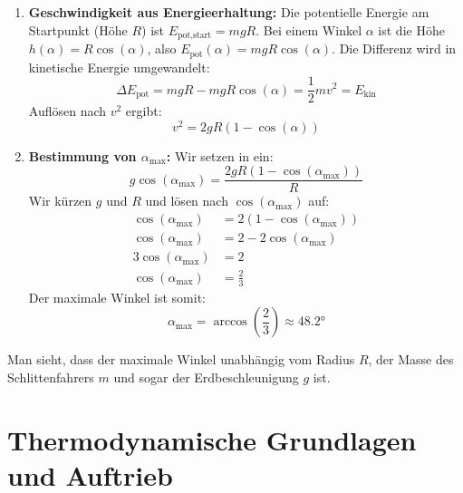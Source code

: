 \documentclass[ngerman]{scrreprt}
\newenvironment{loesungbox}[1]
  {\needspace{5\baselineskip}\begin{loesungboxstyle}[frametitle={#1}]}
  {\end{loesungboxstyle}}
\begin{document}
\begin{loesungbox}{Lösung zu \Cref{aufg:iglu_rutsche}}
\begin{enumerate}
    \item \textbf{Geschwindigkeit aus Energieerhaltung:}
    Die potentielle Energie am Startpunkt (Höhe $R$) ist $E_{\text{pot,start}} = mgR$. Bei einem Winkel $\alpha$ ist die Höhe $h(\alpha) = R\cos(\alpha)$, also $E_{\text{pot}}(\alpha) = mgR\cos(\alpha)$. Die Differenz wird in kinetische Energie umgewandelt: 
    \begin{equation}
        \Delta E_{\text{pot}} = mgR - mgR\cos(\alpha) = \frac{1}{2}mv^2 = E_{\text{kin}}
    \end{equation}
    Auflösen nach $v^2$ ergibt:
    \begin{equation}
        v^2 = 2gR(1-\cos(\alpha)) \label{eq: iglu_v2}
    \end{equation}
    
    \item \textbf{Bestimmung von $\alpha_{\text{max}}$:}
    Wir setzen  in  ein: 
    \begin{equation}
        g\cos(\alpha_{\text{max}}) = \frac{2gR(1-\cos(\alpha_{\text{max}}))}{R}
    \end{equation}
    Wir kürzen $g$ und $R$ und lösen nach $\cos(\alpha_{\text{max}})$ auf:
    \begin{align}
        \cos(\alpha_{\text{max}}) &= 2(1-\cos(\alpha_{\text{max}})) \nonumber\\
        \cos(\alpha_{\text{max}}) &= 2 - 2\cos(\alpha_{\text{max}}) \nonumber\\
        3\cos(\alpha_{\text{max}}) &= 2 \nonumber\\
        \cos(\alpha_{\text{max}}) &= \frac{2}{3}
    \end{align}
    Der maximale Winkel ist somit:
    \begin{equation}
        \alpha_{\text{max}} = \arccos\left(\frac{2}{3}\right) \approx \ang{48.2}
    \end{equation}
\end{enumerate}
Man sieht, dass der maximale Winkel unabhängig vom Radius $R$, der Masse des Schlittenfahrers $m$ und sogar der Erdbeschleunigung $g$ ist. 
\end{loesungbox}







\chapter{Thermodynamische Grundlagen und Auftrieb}\label{chap: thermo_auftrieb}
\end{document}
